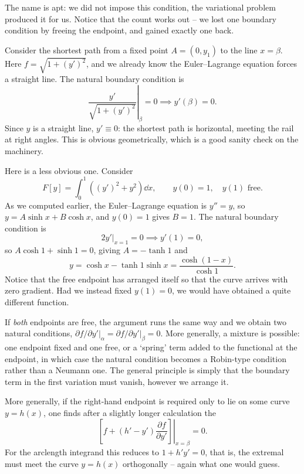 The name is apt: we did not impose this condition, the variational problem produced it for us. Notice that the count works out -- we lost one boundary condition by freeing the endpoint, and gained exactly one back.

\begin{example}
	Consider the shortest path from a fixed point $A = (0, y_1)$ to the line $x = \beta$. Here $f = \sqrt{1 + (y')^2}$, and we already know the Euler--Lagrange equation forces a straight line. The natural boundary condition is
	$$
	\left.\frac{y'}{\sqrt{1 + (y')^2}}\right|_{\beta} = 0 \implies y'(\beta) = 0.
	$$
	Since $y$ is a straight line, $y' \equiv 0$: the shortest path is horizontal, meeting the rail at right angles. This is obvious geometrically, which is a good sanity check on the machinery.
\end{example}

\begin{example}
	Here is a less obvious one. Consider
	$$
	F[y] = \int_0^1\left((y')^2 + y^2 \right)\dd x, \qquad y(0) = 1, \quad y(1) \text{ free}.
	$$
	As we computed earlier, the Euler--Lagrange equation is $y'' = y$, so $y = A\sinh x + B\cosh x$, and $y(0) = 1$ gives $B = 1$. The natural boundary condition is
	$$
	\left.2y'\right|_{x = 1} = 0 \implies y'(1) = 0,
	$$
	so $A\cosh 1 + \sinh 1 = 0$, giving $A = -\tanh 1$ and
	$$
	y = \cosh x - \tanh 1 \sinh x = \frac{\cosh(1 - x)}{\cosh 1}.
	$$
	Notice that the free endpoint has arranged itself so that the curve arrives with zero gradient. Had we instead fixed $y(1) = 0$, we would have obtained a quite different function.
\end{example}

If \emph{both} endpoints are free, the argument runs the same way and we obtain two natural conditions, $\left.\partial f/\partial y'\right|_\alpha = \left.\partial f/\partial y'\right|_\beta = 0$. More generally, a mixture is possible: one endpoint fixed and one free, or a `spring' term added to the functional at the endpoint, in which case the natural condition becomes a Robin-type condition rather than a Neumann one. The general principle is simply that the boundary term in the first variation must vanish, however we arrange it.

More generally, if the right-hand endpoint is required only to lie on some curve $y = h(x)$, one finds after a slightly longer calculation the 
$$
\left.\left[f + (h' - y')\frac{\partial f}{\partial y'}\right]\right|_{x = \beta} = 0.
$$
For the arclength integrand this reduces to $1 + h'y' = 0$, that is, the extremal must meet the curve $y = h(x)$ orthogonally -- again what one would guess.

